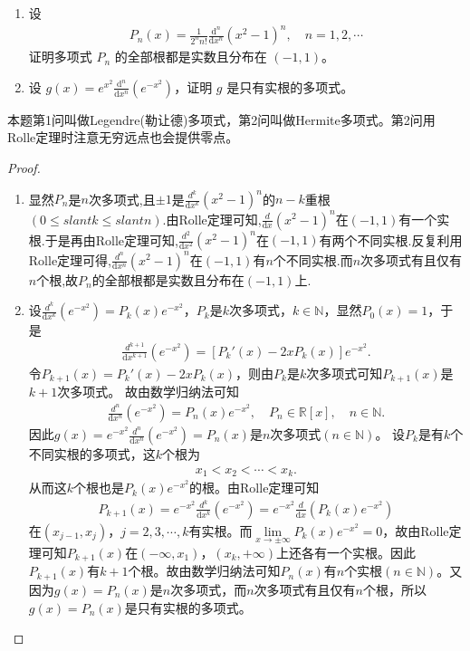 \documentclass[../../main.tex]{subfiles}
\begin{document}
\begin{example}
\begin{enumerate}
\item 设
\begin{align}
P_n(x)=\frac{1}{2^n n!}\frac{\mathrm{d}^n}{\mathrm{d}x^n}(x^2 - 1)^n, \quad n = 1, 2, \cdots
\end{align}
证明多项式 \( P_n \) 的全部根都是实数且分布在 \( (-1, 1) \)。

\item 设 \( g(x)=e^{x^2}\frac{\mathrm{d}^n}{\mathrm{d}x^n}(e^{-x^2}) \)，证明 \( g \) 是只有实根的多项式。
\end{enumerate}
\end{example}
\begin{note}
本题第1问叫做Legendre(勒让德)多项式，第2问叫做Hermite多项式。第2问用Rolle定理时注意无穷远点也会提供零点。
\end{note}
\begin{proof}
\begin{enumerate}
\item 显然$P_n$是$n$次多项式,且$\pm 1$是$\frac{d^k}{\mathrm{d}x^k}(x^2-1)^n$的$n-k$重根$(0\leqslant slant k\leqslant slant n)$.由Rolle定理可知,$\frac{d}{\mathrm{d}x}(x^2-1)^n$在$(-1,1)$有一个实根.于是再由Rolle定理可知,$\frac{d^2}{\mathrm{d}x^2}(x^2-1)^n$在$(-1,1)$有两个不同实根.反复利用Rolle定理可得,$\frac{d^n}{\mathrm{d}x^n}(x^2-1)^n$在$(-1,1)$有$n$个不同实根.而$n$次多项式有且仅有$n$个根,故$P_n$的全部根都是实数且分布在$(-1,1)$上.

\item 设$\frac{d^k}{\mathrm{d}x^k}(e^{-x^2}) = P_k(x)e^{-x^2}$，$P_k$是$k$次多项式，$k\in \mathbb{N}$，显然$P_0(x) = 1$，于是
\begin{align*}
\frac{d^{k+1}}{\mathrm{d}x^{k+1}}(e^{-x^2}) = \left[ P_k'(x) - 2xP_k(x) \right] e^{-x^2}.
\end{align*}
令$P_{k+1}(x) = P_k'(x) - 2xP_k(x)$，则由$P_k$是$k$次多项式可知$P_{k+1}(x)$是$k+1$次多项式。
故由数学归纳法可知
\begin{align*}
\frac{d^n}{\mathrm{d}x^n}(e^{-x^2}) = P_n(x)e^{-x^2}, \quad P_n \in \mathbb{R}[x], \quad n \in \mathbb{N}.
\end{align*}
因此$g(x) = e^{-x^2}\frac{d^n}{\mathrm{d}x^n}(e^{-x^2}) = P_n(x)$是$n$次多项式$(n \in \mathbb{N})$。
设$P_k$是有$k$个不同实根的多项式，这$k$个根为
\begin{align*}
x_1 < x_2 < \cdots < x_k.
\end{align*}
从而这$k$个根也是$P_k(x)e^{-x^2}$的根。由Rolle定理可知
\begin{align*}
P_{k+1}(x) = e^{-x^2}\frac{d^k}{\mathrm{d}x^k}(e^{-x^2}) = e^{-x^2}\frac{d}{\mathrm{d}x}\left( P_k(x)e^{-x^2} \right)
\end{align*}
在$(x_{j-1}, x_j)$，$j=2,3,\cdots,k$有实根。而$\lim\limits_{x \rightarrow \pm \infty} P_k(x)e^{-x^2} = 0$，故由Rolle定理可知$P_{k+1}(x)$在$(-\infty, x_1)$，$(x_k, +\infty)$上还各有一个实根。因此$P_{k+1}(x)$有$k+1$个根。故由数学归纳法可知$P_n(x)$有$n$个实根$(n \in \mathbb{N})$。又因为$g(x) = P_n(x)$是$n$次多项式，而$n$次多项式有且仅有$n$个根，所以$g(x) = P_n(x)$是只有实根的多项式。
\end{enumerate}
\end{proof}
\end{document}
